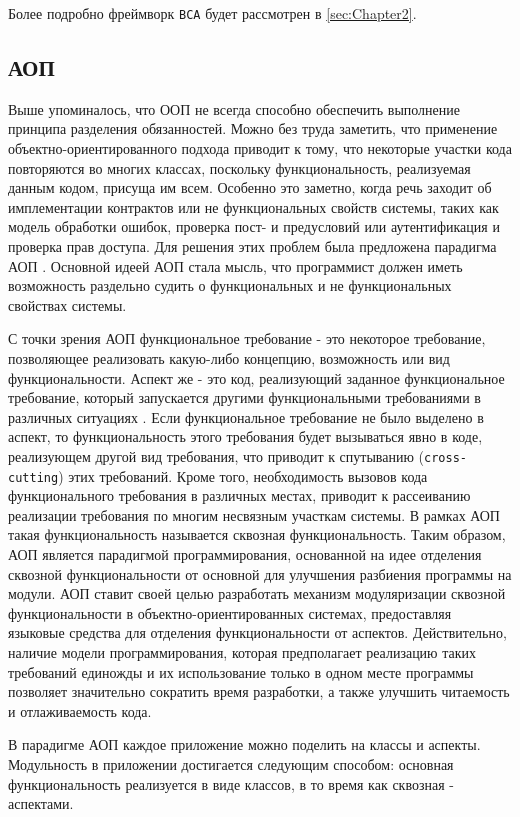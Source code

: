 Более подробно фреймворк \texttt{BCA} будет рассмотрен в \autoref{sec:Chapter2}.

\subsection{АОП}

Выше упоминалось, что ООП не всегда способно обеспечить выполнение принципа разделения обязанностей. Можно без труда заметить, что применение объектно-ориентированного подхода приводит к тому, что некоторые участки кода повторяются во многих классах, поскольку функциональность, реализуемая данным кодом, присуща им всем. Особенно это заметно, когда речь заходит об имплементации контрактов или не функциональных свойств системы, таких как модель обработки ошибок, проверка пост- и предусловий или аутентификация и проверка прав доступа. Для решения этих проблем была предложена парадигма АОП \cite{kiczales1997}. Основной идеей АОП стала мысль, что программист должен иметь возможность раздельно судить о функциональных и не функциональных свойствах системы.

С точки зрения АОП функциональное требование - это некоторое требование, позволяющее реализовать какую-либо концепцию, возможность или вид функциональности. Аспект же - это код, реализующий заданное функциональное требование, который запускается другими функциональными требованиями в различных ситуациях \cite{zhemzhicky}. Если функциональное требование не было выделено в аспект, то функциональность этого требования будет вызываться явно в коде, реализующем другой вид требования, что приводит к спутыванию (\texttt{cross-cutting}) этих требований. Кроме того, необходимость вызовов кода функционального требования в различных местах, приводит к рассеиванию реализации требования по многим несвязным участкам системы. В рамках АОП такая функциональность называется сквозная функциональность. Таким образом, АОП является парадигмой программирования, основанной на идее отделения сквозной функциональности от основной для улучшения разбиения программы на модули. АОП ставит своей целью разработать механизм модуляризации сквозной функциональности в объектно-ориентированных системах, предоставляя языковые средства для отделения функциональности от аспектов. Действительно, наличие модели программирования, которая предполагает реализацию таких требований единожды и их использование только в одном месте программы позволяет значительно сократить время разработки, а также улучшить читаемость и отлаживаемость кода.

В парадигме АОП каждое приложение можно поделить на классы и аспекты. Модульность в приложении достигается следующим способом: основная функциональность реализуется в виде классов, в то время как сквозная - аспектами.

